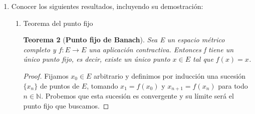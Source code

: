 \documentclass[a4paper, 12pt]{article}
\newtheorem{teorema}{Teorema}
\begin{document}
\begin{enumerate}[label=\textbf{\arabic*}.]
\begin{enumerate}[label=\textit{\alph*})]
	\medskip
	
	\item Versión general del teorema de Heine
	
	\begin{teorema}[\textbf{Heine}]
		Sean E y F dos espacios métricos y \(f: E \rightarrow F\) una función continua. Si E es compacto, entonces f es uniformemente continua.
	\end{teorema}
	
	\begin{proof}
	Por reducción al absurdo, suponemos que \(f\) no es uniformemente continua. Existen sucesiones \(\{x_n\}\) e \(\{y_n\}\) de puntos de \(E\), y un \(\varepsilon > 0\), tales que, para todo \(n \in \mathbb{N}\) se tiene
	\[
		d(x_n.y_n) < 1/n \qquad \text{y} \qquad d(f(x_n),f(y_n)) \geq \varepsilon
	\]
	
	Por ser \(E\) compacto, tenemos una sucesión parcial \(\{x_{\sigma (n)}\}\) que converge a un punto \(x \in E\). Puesto que \(\{d(x_{\sigma(n)}, y_{\sigma (n)})\} \rightarrow 0\), deducimos que también \(\{y_{\sigma (n)}\} \rightarrow x\). Como \(f\) es continua, tenemos que \(\{f(x_{\sigma (n)})\} \rightarrow f(x)\) y \(\{f(y_{\sigma (n)})\} \rightarrow f(x)\), luego \(\{d(f(x_{\sigma (n)}), f(y_{\sigma (n)}))\} \rightarrow 0\), lo cual es una contradicción, ya que \\ \(d(f(x_{\sigma (n)}), f(y_{\sigma (n)})) \geq \varepsilon\) para todo \(n \in \mathbb{N}\).
	\end{proof}
	\end{enumerate}

\bigskip

	\item Conocer los siguientes resultados, incluyendo su demostración:
	
		\begin{enumerate}[label=\textit{\alph*})]
			\item Teorema del punto fijo
			
			\begin{teorema}[\textbf{Punto fijo de Banach}]
			Sea E un espacio métrico completo y \(f: E \rightarrow E\) una aplicación contractiva. Entonces f tiene un único punto fijo, es decir, existe un único punto \(x \in E\) tal que \(f(x) =x\).			
			\end{teorema}
			
			\begin{proof}
			Fijamos \(x_0 \in E\) arbitrario y definimos por inducción una sucesión \(\{x_n\}\) de puntos de \(E\), tomando \(x_1 = f(x_0)\) y \(x_{n+1} = f(x_n)\) para todo \(n \in \mathbb{N}\). Probemos que esta sucesión es convergente y su límite será el punto fijo que buscamos.
			

\end{proof}
\end{enumerate}
\end{enumerate}
\end{document}
